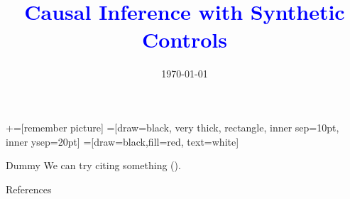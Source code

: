 \documentclass[notes,11pt, aspectratio=169]{beamer}
\title[]{\textcolor{blue}{Causal Inference with Synthetic Controls}}
\institute[GSB]{\small{\begin{tabular}{c}
Alexander J. Almeida \\
Stanford Graduate School of Business\\
\end{tabular}}}
\date{\today}
\begin{document}
\newcommand\marktopleft[1]{%
    \tikz[overlay,remember picture] 
        \node (marker-#1-a) at (-.3em,.3em) {};%
}
\newcommand\markbottomright[2]{%
    \tikz[overlay,remember picture] 
        \node (marker-#1-b) at (0em,0em) {};%
}
+=[remember picture] 
 =[draw=black, very thick, rectangle, inner sep=10pt, inner ysep=20pt]
 =[draw=black,fill=red, text=white]

\begin{frame}
\maketitle
\end{frame}


\begin{frame}{Dummy}
    We can try citing something (\cite{abadie_economic_2003}).
\end{frame}

\begin{frame}{References}
\printbibliography
\end{frame}
\end{document}
